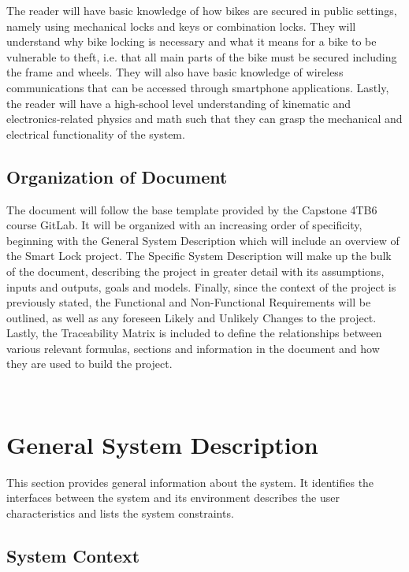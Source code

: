\documentclass[12pt]{article}
\begin{document}
The reader will have basic knowledge of how bikes are secured in public settings, namely using mechanical locks and keys or combination locks. They will understand why bike locking is necessary and what it means for a bike to be vulnerable to theft, i.e. that all main parts of the bike must be secured including the frame and wheels. They will also have basic knowledge of wireless communications that can be accessed through smartphone applications. Lastly, the reader will have a high-school level understanding of kinematic and electronics-related physics and math such that they can grasp the mechanical and electrical functionality of the system.  

\subsection{Organization of Document}

The document will follow the base template provided by the Capstone 4TB6 course GitLab. It will be organized with an increasing order of specificity, beginning with the General System Description which will include an overview of the Smart Lock project. The Specific System Description will make up the bulk of the document, describing the project in greater detail with its assumptions, inputs and outputs, goals and models. Finally, since the context of the project is previously stated, the Functional and Non-Functional Requirements will be outlined, as well as any foreseen Likely and Unlikely Changes to the project. Lastly, the Traceability Matrix is included to define the relationships between various relevant formulas, sections and information in the document and how they are used to build the project.  

~\newpage

\section{General System Description}

This section provides general information about the system.  It identifies the
interfaces between the system and its environment describes the user
characteristics and lists the system constraints.  


\subsection{System Context}
\end{document}
